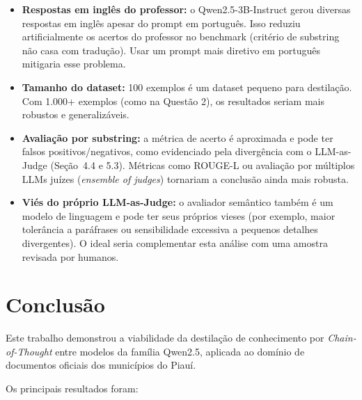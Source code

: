 \documentclass[12pt, a4paper]{article}
\begin{document}
\begin{itemize}
  \item \textbf{Respostas em inglês do professor:} o Qwen2.5-3B-Instruct gerou
        diversas respostas em inglês apesar do prompt em português. Isso reduziu
        artificialmente os acertos do professor no benchmark (critério de substring
        não casa com tradução). Usar um prompt mais diretivo em português mitigaria
        esse problema.

  \item \textbf{Tamanho do dataset:} 100 exemplos é um dataset pequeno para
        destilação. Com 1.000+ exemplos (como na Questão 2), os resultados seriam
        mais robustos e generalizáveis.

  \item \textbf{Avaliação por substring:} a métrica de acerto é aproximada e pode
        ter falsos positivos/negativos, como evidenciado pela divergência com o
        LLM-as-Judge (Seção~4.4 e 5.3). Métricas como ROUGE-L ou avaliação por
        múltiplos LLMs juízes (\textit{ensemble of judges}) tornariam a conclusão
        ainda mais robusta.

  \item \textbf{Viés do próprio LLM-as-Judge:} o avaliador semântico também é um
        modelo de linguagem e pode ter seus próprios vieses (por exemplo, maior
        tolerância a paráfrases ou sensibilidade excessiva a pequenos detalhes
        divergentes). O ideal seria complementar esta análise com uma amostra
        revisada por humanos.
\end{itemize}

\section{Conclusão}

Este trabalho demonstrou a viabilidade da destilação de conhecimento por
\textit{Chain-of-Thought} entre modelos da família Qwen2.5, aplicada ao domínio
de documentos oficiais dos municípios do Piauí.

Os principais resultados foram:
\end{document}
